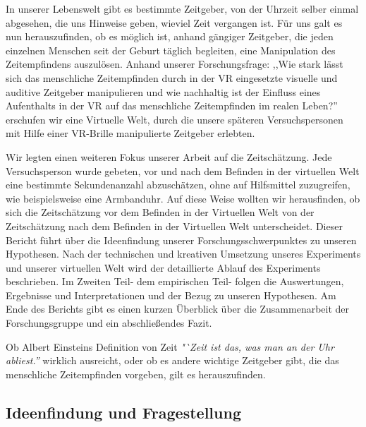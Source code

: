 \documentclass{Bericht}
\begin{document}
	In unserer Lebenswelt gibt es bestimmte Zeitgeber, von der Uhrzeit selber einmal abgesehen, die uns Hinweise geben, wieviel Zeit vergangen ist. Für uns galt es nun herauszufinden, ob es möglich ist, anhand gängiger Zeitgeber, die jeden einzelnen Menschen seit der Geburt täglich begleiten, eine Manipulation des Zeitempfindens auszulösen. Anhand unserer Forschungsfrage: ,,Wie stark lässt sich das menschliche
Zeitempfinden durch in der VR eingesetzte visuelle und auditive Zeitgeber manipulieren und
wie nachhaltig ist der Einfluss eines Aufenthalts in der VR auf das menschliche Zeitempfinden
im realen Leben?'' erschufen wir eine Virtuelle Welt, durch die unsere späteren Versuchspersonen mit Hilfe einer VR-Brille manipulierte Zeitgeber erlebten. 

	 Wir legten einen weiteren Fokus unserer Arbeit auf die Zeitschätzung. Jede Versuchsperson wurde gebeten, vor und nach dem Befinden in der virtuellen Welt eine bestimmte Sekundenanzahl abzuschätzen, ohne auf Hilfsmittel zuzugreifen, wie beispielsweise eine Armbanduhr. Auf diese Weise wollten wir herausfinden, ob sich die Zeitschätzung vor dem Befinden in der Virtuellen Welt von der Zeitschätzung nach dem Befinden in der Virtuellen Welt unterscheidet.
Dieser Bericht führt über die Ideenfindung unserer Forschungsschwerpunktes zu unseren Hypothesen. Nach der technischen und kreativen Umsetzung unseres Experiments und unserer virtuellen Welt wird der detaillierte Ablauf des Experiments beschrieben. Im Zweiten Teil- dem empirischen Teil- folgen die Auswertungen, Ergebnisse und Interpretationen und der Bezug zu unseren Hypothesen. Am Ende des Berichts gibt es einen kurzen Überblick über die Zusammenarbeit der Forschungsgruppe und ein abschließendes Fazit. 

	Ob  Albert Einsteins Definition von Zeit \textit{"`Zeit ist das, was man an der Uhr abliest.'' } wirklich ausreicht, oder ob es andere wichtige Zeitgeber gibt, die das menschliche Zeitempfinden vorgeben, gilt es herauszufinden. 

\subsection{Ideenfindung und Fragestellung}
\end{document}
